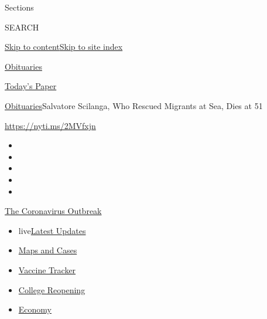 Sections

SEARCH

\protect\hyperlink{site-content}{Skip to
content}\protect\hyperlink{site-index}{Skip to site index}

\href{https://www.nytimes.com/section/obituaries}{Obituaries}

\href{https://myaccount.nytimes.com/auth/login?response_type=cookie\&client_id=vi}{}

\href{https://www.nytimes.com/section/todayspaper}{Today's Paper}

\href{/section/obituaries}{Obituaries}\textbar{}Salvatore Scilanga, Who
Rescued Migrants at Sea, Dies at 51

\url{https://nyti.ms/2MVfxjn}

\begin{itemize}
\item
\item
\item
\item
\item
\end{itemize}

\href{https://www.nytimes.com/news-event/coronavirus?action=click\&pgtype=Article\&state=default\&region=TOP_BANNER\&context=storylines_menu}{The
Coronavirus Outbreak}

\begin{itemize}
\tightlist
\item
  live\href{https://www.nytimes.com/2020/08/03/world/coronavirus-covid-19.html?action=click\&pgtype=Article\&state=default\&region=TOP_BANNER\&context=storylines_menu}{Latest
  Updates}
\item
  \href{https://www.nytimes.com/interactive/2020/us/coronavirus-us-cases.html?action=click\&pgtype=Article\&state=default\&region=TOP_BANNER\&context=storylines_menu}{Maps
  and Cases}
\item
  \href{https://www.nytimes.com/interactive/2020/science/coronavirus-vaccine-tracker.html?action=click\&pgtype=Article\&state=default\&region=TOP_BANNER\&context=storylines_menu}{Vaccine
  Tracker}
\item
  \href{https://www.nytimes.com/2020/08/02/us/covid-college-reopening.html?action=click\&pgtype=Article\&state=default\&region=TOP_BANNER\&context=storylines_menu}{College
  Reopening}
\item
  \href{https://www.nytimes.com/live/2020/08/03/business/stock-market-today-coronavirus?action=click\&pgtype=Article\&state=default\&region=TOP_BANNER\&context=storylines_menu}{Economy}
\end{itemize}

